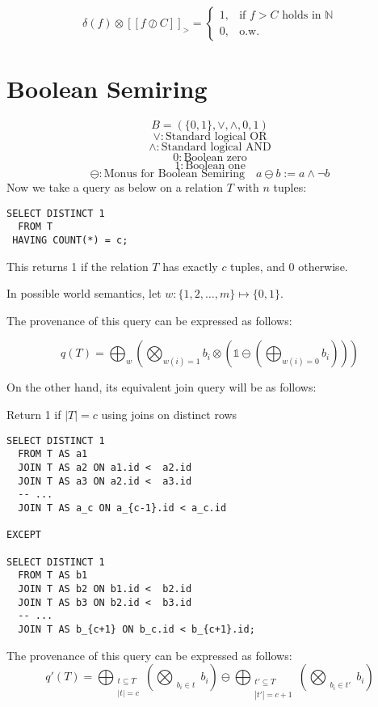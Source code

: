\documentclass[10pt,a4paper]{scrartcl}
\theoremstyle{definition}
\theoremstyle{remark}
\begin{document}
$$
 \delta(f)\otimes[[f \oslash   C]]_{\mathit{>}}=\begin{cases}1, & \text{if } f>C \text{ holds in } \mathbb{N} \\
0,&\text{o.w.}\end{cases}
$$

\section{Boolean Semiring}
$$B = (\{0,1\}, \lor, \land, 0, 1)$$
$$\lor : \text{Standard logical OR}$$
$$\land : \text{Standard logical AND}$$
$$0 : \text{Boolean zero}$$
$$1 : \text{Boolean one}$$
\[
\ominus: \text{Monus for Boolean Semiring} \quad a \ominus b := a \land \neg b
\]
Now we take a query as below on a relation $T$ with $n$ tuples:

\begin{listing}[ht]
\begin{verbatim}
SELECT DISTINCT 1
  FROM T
 HAVING COUNT(*) = c;
\end{verbatim}
\end{listing}

This returns 1 if the relation $T$ has exactly $c$ tuples, and 0 otherwise.

In possible world semantics, let $w: \{1,2,\dots,m\} \mapsto \{0,1\}$.

The provenance of this query can be expressed as follows:

$$q(T) = \bigoplus_{w}\left(\bigotimes_{w(i)=1}b_i\otimes\left(\mathbb{1}\ominus(\bigoplus_{w(i) =0}b_i)\right)\right)$$

On the other hand, its equivalent join query will be as follows:

\begin{listing}[ht]
\caption{Return 1 if \(|T| = c\) using joins on distinct rows}
\begin{verbatim}
SELECT DISTINCT 1
  FROM T AS a1
  JOIN T AS a2 ON a1.id <  a2.id
  JOIN T AS a3 ON a2.id <  a3.id
  -- ...
  JOIN T AS a_c ON a_{c-1}.id < a_c.id

EXCEPT

SELECT DISTINCT 1
  FROM T AS b1
  JOIN T AS b2 ON b1.id <  b2.id
  JOIN T AS b3 ON b2.id <  b3.id
  -- ...
  JOIN T AS b_{c+1} ON b_c.id < b_{c+1}.id;
\end{verbatim}
\end{listing}

The provenance of this query can be expressed as follows:
\[
q'(T) = \bigoplus_{\substack{t\subseteq T \\ |t| = c}}\left(\bigotimes_{\substack{b_i\in t}}b_i\right) \ominus \bigoplus_{\substack{t'\subseteq T \\ |t'| = c+1}}\left(\bigotimes_{\substack{b_i\in t'}}b_i\right)
\]
\end{document}
